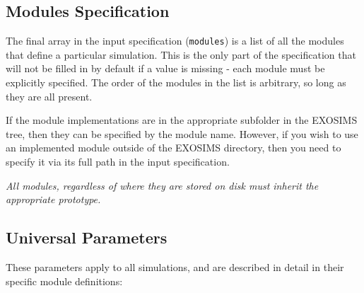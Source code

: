 \documentclass[cleanfoot]{asme2ej}
\begin{document}
\subsection{Modules Specification}
The final array in the input specification  (\verb+modules+) is a list of all the modules that define a particular simulation.  This is the only part of the specification that will not be filled in by default if a value is missing - each module must be explicitly specified. The order of the modules in the list is arbitrary, so long as they are all present. 

If the module implementations are in the appropriate subfolder in the EXOSIMS tree, then they can be specified by the module name.  However, if you wish to use an implemented module outside of the EXOSIMS directory, then you need to specify it via its full path in the input specification.

\emph{All modules, regardless of where they are stored on disk must inherit the appropriate prototype.}

\subsection{Universal Parameters}
These parameters apply to all simulations, and are described in detail in their specific module definitions:
\end{document}
